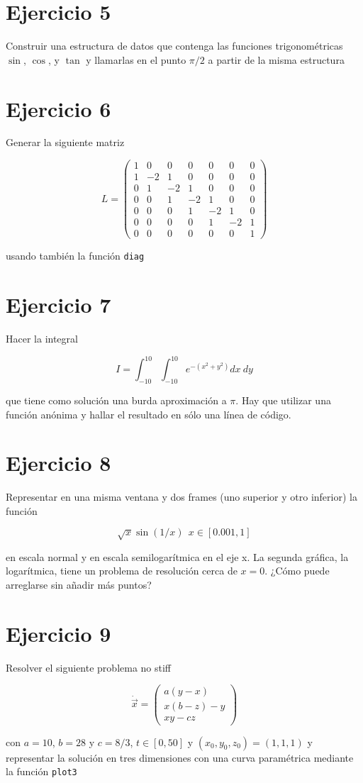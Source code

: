 \documentclass{article}
\begin{document}
\section*{Ejercicio 5}

Construir una estructura de datos que contenga las funciones
trigonométricas $\sin$, $\cos$, y $\tan$ y llamarlas en el punto
$\pi/2$ a partir de la misma estructura

\section*{Ejercicio 6}

Generar la siguiente matriz

\[
L = \left( \begin{array}{ccccccc}
1&0&0&0&0&0&0\\
1&-2&1&0&0&0&0\\
0&1&-2&1&0&0&0\\
0&0&1&-2&1&0&0\\
0&0&0&1&-2&1&0\\
0&0&0&0&1&-2&1\\
0&0&0&0&0&0&1
\end{array} \right)
\]

usando también la función \texttt{diag}

\section*{Ejercicio 7}

Hacer la integral

\[ I=\int_{-10}^{10}\int_{-10}^{10}e^{-(x^2+y^2)}dx\ dy \]

que tiene como solución una burda aproximación a $\pi$.  Hay que
utilizar una función anónima y hallar el resultado en sólo una línea
de código.

\section*{Ejercicio 8}

Representar en una misma ventana y dos frames (uno superior y otro
inferior) la función

\[ \sqrt{x} \sin(1/x)\ \ x\in[0.001,1] \]

en escala normal y en escala semilogarítmica en el eje x.  La segunda
gráfica, la logarítmica, tiene un problema de resolución cerca de
$x=0$.  ¿Cómo puede arreglarse sin añadir más puntos?

\section*{Ejercicio 9}

Resolver el siguiente problema no stiff

\[ \dot {\vec x} = \left(
  \begin{array}{c}
a(y-x)\\
x(b-z)-y\\
xy-cz  
  \end{array}
\right)   \]

con $a=10$, $b=28$ y $c=8/3$, $t \in [0,50]$ y
$(x_0,y_0,z_0)=(1,1,1)$ y representar la solución en tres dimensiones
con una curva paramétrica mediante la función \texttt{plot3}
\end{document}
